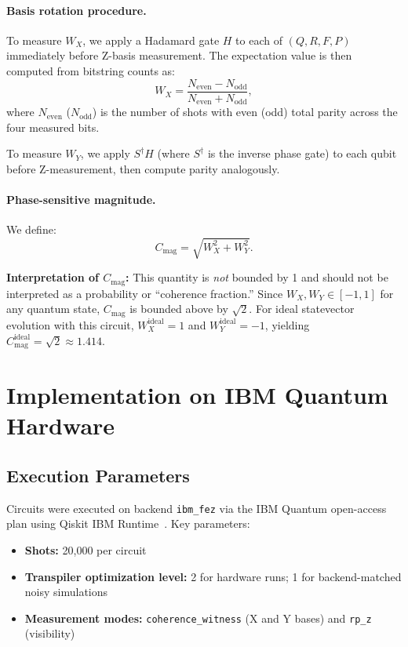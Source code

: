 \documentclass[11pt]{article}
\begin{document}
\paragraph{Basis rotation procedure.}
To measure $W_X$, we apply a Hadamard gate $H$ to each of $(Q, R, F, P)$ immediately before Z-basis measurement. The expectation value is then computed from bitstring counts as:
\begin{equation}
W_X = \frac{N_\mathrm{even} - N_\mathrm{odd}}{N_\mathrm{even} + N_\mathrm{odd}},
\end{equation}
where $N_\mathrm{even}$ ($N_\mathrm{odd}$) is the number of shots with even (odd) total parity across the four measured bits.

To measure $W_Y$, we apply $S^\dagger H$ (where $S^\dagger$ is the inverse phase gate) to each qubit before Z-measurement, then compute parity analogously.

\paragraph{Phase-sensitive magnitude.}
We define:
\begin{equation}
C_\mathrm{mag} = \sqrt{W_X^2 + W_Y^2}.
\end{equation}

\noindent\textbf{Interpretation of $C_\mathrm{mag}$:} This quantity is \emph{not} bounded by 1 and should not be interpreted as a probability or ``coherence fraction.'' Since $W_X, W_Y \in [-1, 1]$ for any quantum state, $C_\mathrm{mag}$ is bounded above by $\sqrt{2}$. For ideal statevector evolution with this circuit, $W_X^\mathrm{ideal} = 1$ and $W_Y^\mathrm{ideal} = -1$, yielding $C_\mathrm{mag}^\mathrm{ideal} = \sqrt{2} \approx 1.414$.


\section{Implementation on IBM Quantum Hardware}
\label{sec:implementation}

\subsection{Execution Parameters}

Circuits were executed on backend \texttt{ibm\_fez} via the IBM Quantum open-access plan using Qiskit IBM Runtime~\cite{qiskitibmruntime}. Key parameters:
\begin{itemize}
    \item \textbf{Shots:} 20,000 per circuit
    \item \textbf{Transpiler optimization level:} 2 for hardware runs; 1 for backend-matched noisy simulations
    \item \textbf{Measurement modes:} \texttt{coherence\_witness} (X and Y bases) and \texttt{rp\_z} (visibility)
\end{itemize}
\end{document}
